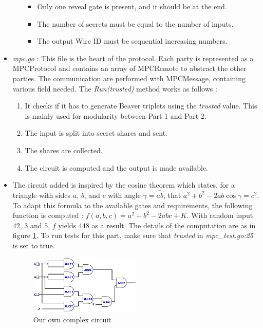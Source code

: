 \documentclass[10pt,conference]{IEEEtran}
\begin{document}
\begin{itemize}
\begin{itemize}
            \begin{itemize}
                \item Only one reveal gate is present, and it should be at the end.
                \item The number of secrets must be equal to the number of inputs.
                \item The output Wire ID must be sequential increasing numbers.
            \end{itemize}
        \end{itemize}
    \item \textit{mpc.go} : This file is the heart of the protocol. Each party is represented as a MPCProtocol and contains an array of MPCRemote to abstract the other parties. The communication are performed with MPCMessage, containing various field needed. The \textit{Run(trusted)} method works as follows :
        \begin{enumerate}
            \item It checks if it has to generate Beaver triplets using the \textit{trusted} value. This is mainly used for modularity between Part 1 and Part 2.
            \item The input is split into secret shares and sent.
            \item The shares are collected.
            \item The circuit is computed and the output is made available.
        \end{enumerate}
      \item The circuit added is inspired by the cosine theorem which states, for a triangle with sides $a$, $b$, and $c$ with angle $\gamma = \widehat{ab}$, that $a^2 + b^2 - 2ab\cos\gamma = c^2$. To adapt this formula to the available gates and requirements, the following function is computed : $f(a,b,c) = a^2 + b^2 - 2abc + K$. With random input $42$, $3$ and $5$, $f$ yields $448$ as a result. The details of the computation are as in figure \ref{fig:circ}. To run tests for this part, make sure that \textit{trusted} in \textit{mpc\_test.go:25} is set to true.
\begin{figure}[h]
  \caption{Our own complex circuit}
  \label{fig:circ}
  \includegraphics[width=0.5\textwidth]{main.png}
\end{figure}


\end{itemize}
\end{document}
